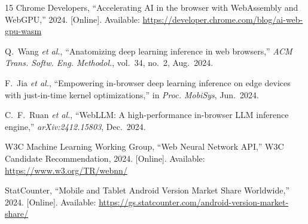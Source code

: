\documentclass[conference]{IEEEtran}
\begin{document}
\begin{thebibliography}{15}
Chrome Developers,
``Accelerating AI in the browser with WebAssembly and WebGPU,'' 2024.
[Online]. Available:
\url{https://developer.chrome.com/blog/ai-web-gpu-wasm}

Q.~Wang \textit{et al.},
``Anatomizing deep learning inference in web browsers,''
\textit{ACM Trans. Softw. Eng. Methodol.}, vol.~34, no.~2, Aug.~2024.

F.~Jia \textit{et al.},
``Empowering in-browser deep learning inference on edge devices with
just-in-time kernel optimizations,''
in \textit{Proc. MobiSys}, Jun.~2024.

C.~F.~Ruan \textit{et al.},
``WebLLM: A high-performance in-browser LLM inference engine,''
\textit{arXiv:2412.15803}, Dec.~2024.

W3C Machine Learning Working Group,
``Web Neural Network API,'' W3C Candidate Recommendation, 2024.
[Online]. Available: \url{https://www.w3.org/TR/webnn/}

StatCounter, ``Mobile and Tablet Android Version Market Share
Worldwide,'' 2024. [Online]. Available:
\url{https://gs.statcounter.com/android-version-market-share/}

\end{thebibliography}
\end{document}
